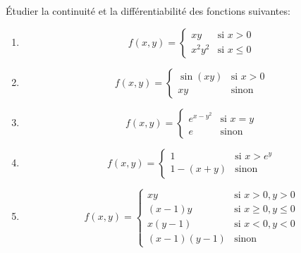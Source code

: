 
\begin{exercice}\label{exo0044}

Étudier la continuité et la différentiabilité des fonctions suivantes:
\begin{multicols}{2}
\begin{enumerate}
	\item
	\begin{equation}
		f(x,y)=
			\begin{cases}
				xy	&	\text{si }x>0\\
				x^2y^2	&	 \text{si }x\leq 0
			\end{cases}
	\end{equation}

	\item		\label{Item0044b}
	\begin{equation}
		f(x,y)=
			\begin{cases}
				\sin(xy)	&	\text{si }x>0\\
				xy	&	 \text{sinon}
			\end{cases}
	\end{equation}
	\item
	\begin{equation}
		f(x,y)=
			\begin{cases}
				 e^{x-y^2}	&	\text{si }x=y\\
				e	&	 \text{sinon}
			\end{cases}
	\end{equation}
	\item
	\begin{equation}
		f(x,y)=
			\begin{cases}
				1	&	\text{si }x>e^y\\
				1-(x+y)	&	 \text{sinon}
			\end{cases}
	\end{equation}
	\item
	\begin{equation}
		f(x,y)=
			\begin{cases}
				xy	&	\text{si }x>0,y>0\\
				(x-1)y	&	 \text{si }x\geq 0,y\leq 0\\
				x(y-1)	&	 \text{si }x<0,y<0\\
				(x-1)(y-1)	&	 \text{sinon}
			\end{cases}
	\end{equation}
\end{enumerate}
\end{multicols}

\end{exercice}
